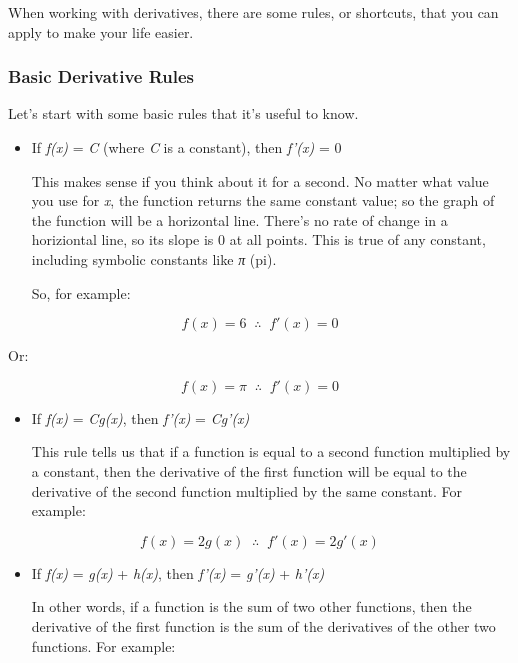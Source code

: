 \documentclass[11pt]{article}
\begin{document}
When working with derivatives, there are some rules, or shortcuts, that
you can apply to make your life easier.

\subsubsection{Basic Derivative Rules}\label{basic-derivative-rules}

Let's start with some basic rules that it's useful to know.

\begin{itemize}
\item
  If \emph{f(x)} = \emph{C} (where \emph{C} is a constant), then
  \emph{f'(x)} = 0

  This makes sense if you think about it for a second. No matter what
  value you use for \emph{x}, the function returns the same constant
  value; so the graph of the function will be a horizontal line. There's
  no rate of change in a horiziontal line, so its slope is 0 at all
  points. This is true of any constant, including symbolic constants
  like \emph{π} (pi).

  So, for example:
\end{itemize}

\begin{equation}f(x) = 6 \;\; \therefore \;\; f'(x) = 0 \end{equation}

Or:

\begin{equation}f(x) = \pi \;\; \therefore \;\; f'(x) = 0 \end{equation}

\begin{itemize}
\item
  If \emph{f(x)} = \emph{Cg(x)}, then \emph{f'(x)} = \emph{Cg'(x)}

  This rule tells us that if a function is equal to a second function
  multiplied by a constant, then the derivative of the first function
  will be equal to the derivative of the second function multiplied by
  the same constant. For example:
\end{itemize}

\begin{equation}f(x) = 2g(x) \;\; \therefore \;\; f'(x) = 2g'(x) \end{equation}

\begin{itemize}
\item
  If \emph{f(x)} = \emph{g(x)} + \emph{h(x)}, then \emph{f'(x)} =
  \emph{g'(x)} + \emph{h'(x)}

  In other words, if a function is the sum of two other functions, then
  the derivative of the first function is the sum of the derivatives of
  the other two functions. For example:
\end{itemize}
\end{document}
